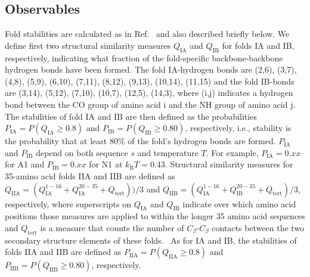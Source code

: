 \documentclass[
aip,
rsi,%
amsmath,amssymb,
reprint,%
]{revtex4-1}
\newcommand	 {\sbar}	{{s}}
\newcommand	 {\kb}		{{k_\mathrm{B}}}
\newcommand {\QIA}	{{Q_\mathrm{IA}}}
\newcommand {\QIB}	{{Q_\mathrm{IB}}}
\newcommand {\QIIA}	{{Q_\mathrm{IIA}}}
\newcommand {\QIIB}	{{Q_\mathrm{IIB}}}
\newcommand {\PIA}    	{{P_\mathrm{IA}}}
\newcommand {\PIB}    	{{P_\mathrm{IB}}}
\newcommand {\PIIA}    	{{P_\mathrm{IIA}}}
\newcommand {\PIIB}    	{{P_\mathrm{IIB}}}
\begin{document}
\subsection{Observables}
\noindent
Fold stabilities are calculated as in Ref.~ and also described briefly below. We define first two structural similarity measures $\QIA$ and $\QIB$ for folds IA and IB, respectively, indicating what fraction of the fold-specific backbone-backbone hydrogen bonds have been formed. The fold IA-hydrogen bonds are (2,6), (3,7), (4,8), (5,9), (6,10), (7,11), (8,12), (9,13), (10,14), (11,15) and the fold IB-bonds are (3,14), (5,12), (7,10), (10,7), (12,5), (14,3), where (i,j) indicates a hydrogen bond between the CO group of amino acid i and the NH group of amino acid j. The  stabilities of fold IA and IB are then defined as the probabilities $\PIA = P(\QIA\ge0.8)$ and $\PIB = P(\QIB\ge0.80)$, respectively, i.e., stability is the probability that at least 80\% of the fold's hydrogen bonds are formed. $\PIA$ and $\PIB$ depend on both sequence $\sbar$ and temperature $T$. For example, $\PIA=0.xx$ for A1 and $\PIB=0.xx$ for N1 at $\kb T = 0.43$. Structural similarity measures for 35-amino acid folds IIA and IIB are defined as $\QIIA = ( Q_\mathrm{IA}^\mathrm{1-16} + Q_\mathrm{IA}^\mathrm{20-35} + Q_\mathrm{tert}) ) / 3$ and $\QIIB = ( Q_\mathrm{IA}^\mathrm{1-16} + Q_\mathrm{IB}^\mathrm{20-35} + Q_\mathrm{tert} ) / 3$, respectively, where superscripts on $\QIA$ and $\QIB$ indicate over which amino acid positions those measures are applied to within the longer 35 amino acid sequences and $Q_\mathrm{tert}$ is a measure that counts the number of $C_\beta$-$C_\beta$ contacts between the two secondary structure elements of these folds.~\cite{Holzgrafe2015} As for IA and IB, the stabilities of folds IIA and IIB are defined as $\PIIA = P(\QIIA\ge0.8)$ and $\PIIB = P(\QIIB\ge0.80)$, respectively. 
\end{document}
